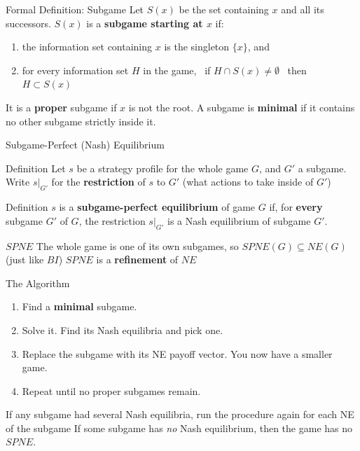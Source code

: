 \begin{frame}{Formal Definition: Subgame}
Let $S(x)$ be the set containing $x$ and all its successors.
\bsk
$S(x)$ is a \textbf{subgame starting at $x$} if:
\bsk
\begin{enumerate}
    \item the information set containing $x$ is the singleton $\{x\}$, and
    \bsk
    \item for every information set $H$ in the game, \ if $H\cap S(x)\ne\emptyset$
      \ then \ $H\subset S(x)$
\end{enumerate}
\bsk
It is a \textbf{proper} subgame if $x$ is not the root.
\vfill
A subgame is \textbf{minimal} if it contains no other subgame strictly inside it.
\vspace{-0.3in}
\end{frame}


\begin{frame}[standout]
Subgame-Perfect (Nash) Equilibrium
\end{frame}

\begin{frame}{Definition}
Let $s$ be a strategy profile for the whole game $G$, and $G'$ a subgame. Write
$s|_{G'}$ for the \textbf{restriction} of $s$ to $G'$ (what actions to take inside of $G'$)
\bsk
\begin{block}{Definition}
$s$ is a \textbf{subgame-perfect equilibrium} of game $G$ if, for \textbf{every} subgame $G'$ of $G$,
the restriction $s|_{G'}$ is a Nash equilibrium of subgame $G'$.
\end{block}
\bsk
$SPNE$
\bsk
The whole game is one of its own subgames, so $SPNE(G)\subseteq NE(G)$ (just like $BI$)
\vfill
$SPNE$ is a \textbf{refinement} of $NE$
\vspace{-0.4in}
\end{frame}


\begin{frame}{The Algorithm}
\begin{enumerate}
    \item Find a \textbf{minimal} subgame.
    \bsk
    \item Solve it. Find its Nash equilibria and pick one.
    \bsk
    \item Replace the subgame with its NE payoff vector.
      You now have a smaller game.
    \bsk
    \item Repeat until no proper subgames remain.
\end{enumerate}
\bsk
\vfill
If any subgame had several Nash equilibria, run the procedure again for each NE of the subgame
\bsk
{\footnotesize If some subgame has \textit{no} Nash equilibrium, then the game has no $SPNE$.}
\vspace{-0.3in}
\end{frame}

